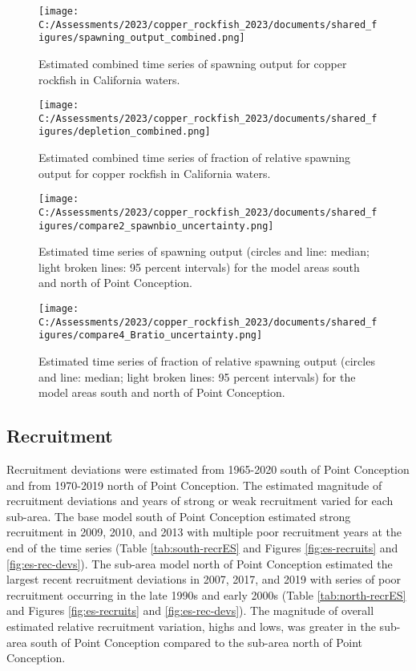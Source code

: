 \documentclass[11pt,
  english,
  letterpaper,
]{article}
\begin{document}
\begin{figure}
\centering
\texttt{[image: C:/Assessments/2023/copper\_rockfish\_2023/documents/shared\_figures/spawning\_output\_combined.png]}
\caption{Estimated combined time series of spawning output for copper rockfish in California waters.\label{fig:es-sb-all}}
\end{figure}

\begin{figure}
\centering
\texttt{[image: C:/Assessments/2023/copper\_rockfish\_2023/documents/shared\_figures/depletion\_combined.png]}
\caption{Estimated combined time series of fraction of relative spawning output for copper rockfish in California waters.\label{fig:es-depl-all}}
\end{figure}

\begin{figure}
\centering
\texttt{[image: C:/Assessments/2023/copper\_rockfish\_2023/documents/shared\_figures/compare2\_spawnbio\_uncertainty.png]}
\caption{Estimated time series of spawning output (circles and line: median; light broken lines: 95 percent intervals) for the model areas south and north of Point Conception.\label{fig:es-sb}}
\end{figure}

\begin{figure}
\centering
\texttt{[image: C:/Assessments/2023/copper\_rockfish\_2023/documents/shared\_figures/compare4\_Bratio\_uncertainty.png]}
\caption{Estimated time series of fraction of relative spawning output (circles and line: median; light broken lines: 95 percent intervals) for the model areas south and north of Point Conception.\label{fig:es-depl}}
\end{figure}

\pagebreak

\hypertarget{recruitment}{%
\subsection*{Recruitment}\label{recruitment}}

Recruitment deviations were estimated from 1965-2020 south of Point Conception and from 1970-2019 north of Point Conception. The estimated magnitude of recruitment deviations and years of strong or weak recruitment varied for each sub-area. The base model south of Point Conception estimated strong recruitment in 2009, 2010, and 2013 with multiple poor recruitment years at the end of the time series (Table \ref{tab:south-recrES} and Figures \ref{fig:es-recruits} and \ref{fig:es-rec-devs}). The sub-area model north of Point Conception estimated the largest recent recruitment deviations in 2007, 2017, and 2019 with series of poor recruitment occurring in the late 1990s and early 2000s (Table \ref{tab:north-recrES} and Figures \ref{fig:es-recruits} and \ref{fig:es-rec-devs}). The magnitude of overall estimated relative recruitment variation, highs and lows, was greater in the sub-area south of Point Conception compared to the sub-area north of Point Conception.
\end{document}
